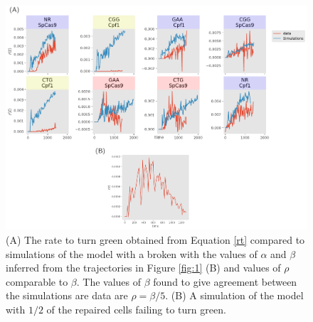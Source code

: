 \documentclass{article}
\begin{document}


\begin{figure}[h!]
\centering
\includegraphics[scale=0.6]{fig2.pdf}
\caption{ (A) The rate to turn green obtained from Equation \ref{rt} compared to simulations of the model with a broken with the values of $\alpha$ and $\beta$ inferred from the trajectories in Figure \ref{fig:1} (B) and values of $\rho$ comparable to $\beta$. The values of $\beta$ found to give agreement between the simulations are data are $\rho = \beta/5$. (B) A simulation of the model with $1/2$ of the repaired cells failing to turn green.  }\label{fig:2}
\end{figure}
\end{document}
